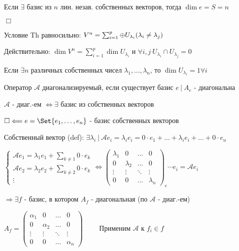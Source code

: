 \documentclass[12pt]{article}
\begin{document}
    Если $\exists$ базис из $n$ лин. незав. собственных векторов, тогда $\dim e = S = n$

    $\Box$

    \Nota Условие Th равносильно: $V^n = \sum_{i=1}^p \oplus U_{\lambda_i} (\lambda_i \neq \lambda_j)$

    Действительно: $\dim V^n = \sum_{i=1}^p \dim U_{\lambda_i}$ и $\forall i, j \ U_{\lambda_i} \cap U_{\lambda_j} = 0$

    \Ex Если $\exists n$ различных собственных чисел $\lambda_1, \dots, \lambda_n$, то $\dim U_{\lambda_i} = 1 \forall i$

    \Def Оператор $\mathcal{A}$ диагонализируемый, если существует базис $e \ | \ A_e$ - диагональна

    \hypertarget{diagonalizedmatrixtheorem}{}

    \Th $\mathcal{A}$ - диаг.-ем $\Longleftrightarrow \exists$ базис из собственных векторов

    $\Box \Longleftarrow e = \Set{e_1, \dots, e_n}$ - базис собственных векторов

    Собственный вектор (def): $\exists \lambda_i \ | \ \mathcal{A}e_i = \lambda_i e_i = 0 \cdot e_1 + \dots + \lambda_i e_i + \dots + 0 \cdot e_n$

    $\begin{cases}
         \mathcal{A}e_1 = \lambda_1 e_1 + \sum_{k \neq 1} 0 \cdot e_k \\
         \mathcal{A}e_2 = \lambda_2 e_2 + \sum_{k \neq 2} 0 \cdot e_k \\
         \vdots
    \end{cases} \Longleftrightarrow \begin{pmatrix}
                                        \lambda_1 & 0         & \dots  & 0         \\
                                        0         & \lambda_2 & \dots  & 0         \\
                                        \vdots    & \vdots    & \ddots & \vdots    \\
                                        0         & 0         & \dots  & \lambda_n
    \end{pmatrix}_e \cdots e_i = \mathcal{A} e_i$

    $\Longrightarrow \exists f$ - базис, в котором $A_f$ - диагональная (по \Defs $\mathcal{A}$ - диаг.-ем)

    $A_f = \begin{pmatrix}
               \alpha_1 & 0        & \dots  & 0        \\
               0        & \alpha_2 & \dots  & 0        \\
               \vdots   & \vdots   & \ddots & \vdots   \\
               0        & 0        & \dots  & \alpha_n
    \end{pmatrix} \quad\quad$ Применим $\mathcal{A}$ к $f_i \in f$
\end{document}
